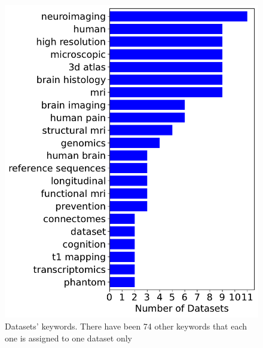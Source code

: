 \begin{figure}
    \centering
    \includegraphics[width=\textwidth,height=\textheight,keepaspectratio]{figures/Datasets Keyword.pdf}
    \caption{Datasets' keywords. There have been 74 other keywords that each one is assigned to one dataset only}
    \label{fig:dataset_keywords}
\end{figure}

